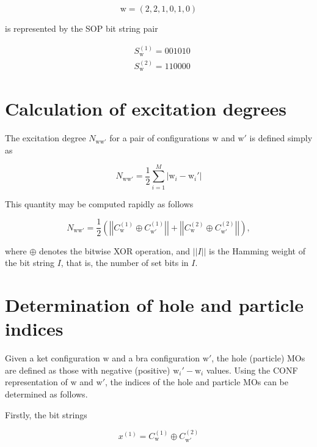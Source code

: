 \documentclass[12pt,a4paper]{report}
\begin{document}
\begin{equation*}
  \text{w} = (2,2,1,0,1,0)
\end{equation*}

\noindent
is represented by the SOP bit string pair

\begin{equation*}
  \begin{aligned}
    &S_{\text{w}}^{(1)} = 0 0 1 0 1 0 \\
    &S_{\text{w}}^{(2)} = 1 1 0 0 0 0
  \end{aligned}
\end{equation*}

\section{Calculation of excitation degrees}
The excitation degree $N_{\text{w}\text{w}'}$ for a pair of
configurations $\text{w}$ and $\text{w}'$ is defined simply as

\begin{equation}
  N_{\text{w}\text{w}'} = \frac{1}{2}\sum_{i=1}^{M} |\text{w}_{i} -
  \text{w}_{i}'|
\end{equation}

\noindent
This quantity may be computed rapidly as follows

\begin{equation}
  N_{\text{w}\text{w}'} = \frac{1}{2} \left( \left|\left|
  C_{\text{w}}^{(1)} \oplus C_{\text{w}'}^{(1)} \right|\right| +
  \left|\left| C_{\text{w}}^{(2)} \oplus C_{\text{w}'}^{(2)}
  \right|\right| \right),
\end{equation}

\noindent
where $\oplus$ denotes the bitwise XOR operation, and $||I||$ is the
Hamming weight of the bit string $I$, that is, the number of set bits
in $I$.

\section{Determination of hole and particle indices}
Given a ket configuration $\text{w}$ and a bra configuration
$\text{w}'$, the hole (particle) MOs are defined as those with
negative (positive) $\text{w}_{i}' - \text{w}_{i}$ values. Using the
CONF representation of $\text{w}$ and $\text{w}'$, the indices of the
hole and particle MOs can be determined as follows.

Firstly, the bit strings

\begin{equation}
  x^{(1)} = C_{\text{w}}^{(1)} \oplus C_{\text{w}'}^{(2)}
\end{equation}
\end{document}
